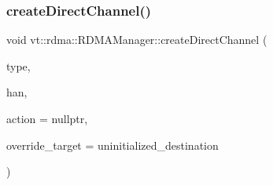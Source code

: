 \subsubsection{\texorpdfstring{create\+Direct\+Channel()}{createDirectChannel()}}
{\footnotesize\ttfamily void vt\+::rdma\+::\+R\+D\+M\+A\+Manager\+::create\+Direct\+Channel (\begin{DoxyParamCaption}\item[{\hyperlink{namespacevt_1_1rdma_ac848e1d9da43db6294bd06f83e5d3946}{R\+D\+M\+A\+\_\+\+Type\+Type} const \&}]{type,  }\item[{\hyperlink{namespacevt_a10442579ec4e7ebef223818e64bcf908}{R\+D\+M\+A\+\_\+\+Handle\+Type} const \&}]{han,  }\item[{\hyperlink{namespacevt_ae0a5a7b18cc99d7b732cb4d44f46b0f3}{Action\+Type} const \&}]{action = {\ttfamily nullptr},  }\item[{\hyperlink{namespacevt_a866da9d0efc19c0a1ce79e9e492f47e2}{Node\+Type} const \&}]{override\+\_\+target = {\ttfamily uninitialized\+\_\+destination} }\end{DoxyParamCaption})\hspace{0.3cm}{\ttfamily [private]}}

\mbox{\label{structvt_1_1rdma_1_1_r_d_m_a_manager_a3b0d77f20a7c6395fd239b3579056798}} 

